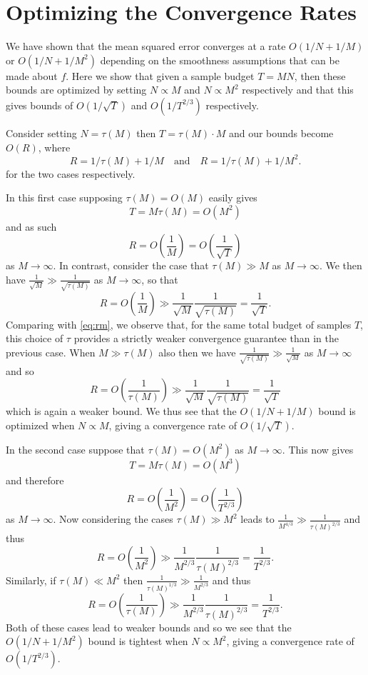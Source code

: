 
\section{Optimizing the Convergence Rates}
\label{sec:app:opt-conv}

We have shown that the mean squared error converges at a rate $O(1/N + 1/M)$ or
$O(1/N + 1/M^2)$ depending on the smoothness assumptions that can be made about
$f$.  Here we show that given a sample budget $T=MN$, then these bounds are
optimized by setting $N \propto M$ and $N \propto M^2$ respectively and that this
gives bounds of $O(1/\sqrt{T})$ and $O(1/T^{2/3})$ respectively.

Consider setting $N = \tau(M)$ then $T = \tau(M) \cdot M$ and our bounds become $O(R)$, where
\[
  R = 1/\tau(M) + 1/M \quad \text{and} \quad R = 1/\tau(M) + 1/M^2.
\]
for the two cases respectively.

In this first case supposing $\tau(M) = O(M)$ easily gives
\[
  T = M \tau(M)
    = O\left(M^2\right)
\]
and as such 
\begin{equation} \label{eq:rm}
  R = O\left(\frac{1}{M}\right) = O\left(\frac{1}{\sqrt{T}}\right)
\end{equation}
as $M \to \infty$.  In contrast, consider the case that $\tau(M) \gg M$ as $M \to \infty$. We then have
$\frac{1}{\sqrt{M}} \gg \frac{1}{\sqrt{\tau(M)}}$ as $M \to \infty$, so that
\[
  R = O\left(\frac{1}{M}\right) \gg \frac{1}{\sqrt{M}} \frac{1}{\sqrt{\tau(M)}} = \frac{1}{\sqrt{T}}.
\]
Comparing with \eqref{eq:rm}, we observe that, for the same total
budget of samples $T$, this choice of $\tau$ provides a strictly weaker convergence
guarantee than in the previous case. When $M \gg \tau(M)$ also then we have
$\frac{1}{\sqrt{\tau(M)}} \gg \frac{1}{\sqrt{M}}$ as $M \to \infty$ and so
\[
R = O\left(\frac{1}{\tau(M)}\right) \gg \frac{1}{\sqrt{M}} \frac{1}{\sqrt{\tau(M)}} = \frac{1}{\sqrt{T}}
\]
which is again a weaker bound.  We thus see that the $O(1/N + 1/M)$ bound is optimized when
$N \propto M$, giving a convergence rate of $O(1/\sqrt{T})$.

In the second case suppose that $\tau(M) = O(M^2)$ as $M \to \infty$.  This now gives
\[
  T = M \tau(M)
  = O\left(M^3\right)
\]
and therefore
\[
R = O\left(\frac{1}{M^2}\right) = O\left(\frac{1}{T^{2/3}}\right)
\]
as $M \to \infty$.  Now considering the cases $\tau(M) \gg M^2$ leads to $\frac{1}{M^{4/3}}  \gg \frac{1}{\tau(M)^{2/3}}$ and thus
\[
R = O\left(\frac{1}{M^2}\right) \gg \frac{1}{M^{2/3}} \frac{1}{\tau(M)^{2/3}} = \frac{1}{T^{2/3}}.
\]
Similarly, if $\tau(M) \ll M^2$ then $\frac{1}{\tau(M)^{1/3}}\gg \frac{1}{M^{2/3}}$ and thus
\[
R = O\left(\frac{1}{\tau(M)}\right) \gg \frac{1}{M^{2/3}} \frac{1}{\tau(M)^{2/3}} = \frac{1}{T^{2/3}}.
\]
Both of these cases lead to weaker bounds and so we see that the $O(1/N + 1/M^2)$ bound
is tightest when $N \propto M^2$, giving a convergence rate of $O(1/T^{2/3})$.